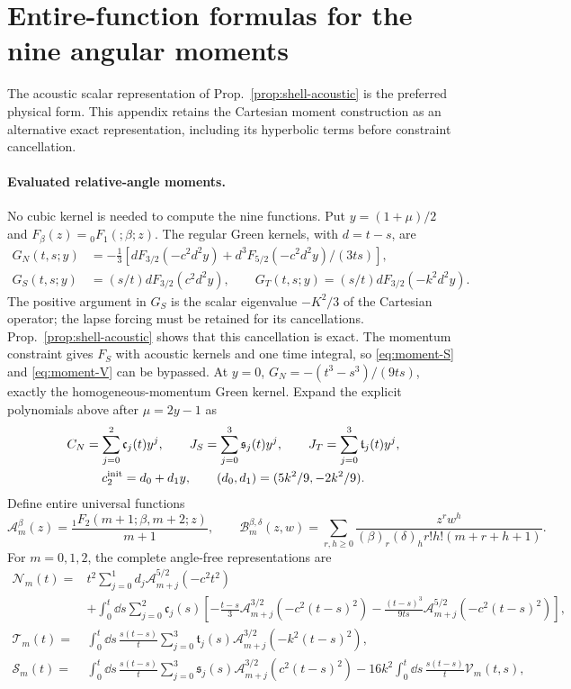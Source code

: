 \section{Entire-function formulas for the nine angular moments}\label{app:scalar-moments}
The acoustic scalar representation of Prop.~\ref{prop:shell-acoustic} is the preferred
physical form. This appendix retains the Cartesian moment construction as an alternative
exact representation, including its hyperbolic terms before constraint cancellation.

\paragraph{Evaluated relative-angle moments.}
No cubic kernel is needed to compute the nine functions. Put $y=(1+\mu)/2$ and
$F_\beta(z)={}_0F_1(;\beta;z)$. The regular Green kernels, with $d=t-s$, are
\begin{align}
 G_N(t,s;y)&=-\tfrac13[dF_{3/2}(-c^2d^2y)+d^3F_{5/2}(-c^2d^2y)/(3ts)],\label{eq:moment-GN}\\
 G_S(t,s;y)&=(s/t)dF_{3/2}(c^2d^2y),\qquad
 G_T(t,s;y)=(s/t)dF_{3/2}(-k^2d^2y).\label{eq:moment-GST}
\end{align}
The positive argument in $G_S$ is the scalar eigenvalue $-K^2/3$ of the Cartesian operator;
the lapse forcing must be retained for its cancellations. Prop.~\ref{prop:shell-acoustic} shows
that this cancellation is exact. The momentum constraint gives $F_S$ with acoustic kernels and one
time integral, so \eqref{eq:moment-S} and \eqref{eq:moment-V} can be bypassed. At $y=0$,
$G_N=-(t^3-s^3)/(9ts)$, exactly the homogeneous-momentum Green kernel.
Expand the explicit polynomials above after $\mu=2y-1$ as
\begin{gather*}
 C_N=\sum_{j=0}^2\mathfrak c_j(t)y^j,\qquad
 J_S=\sum_{j=0}^3\mathfrak s_j(t)y^j,\qquad
 J_T=\sum_{j=0}^3\mathfrak t_j(t)y^j,\\
 c_2^{\rm init}=d_0+d_1y,\qquad(d_0,d_1)=(5k^2/9,-2k^2/9).
\end{gather*}
Define entire universal functions
\begin{equation}\label{eq:moment-entire}
 \mathscr A_m^\beta(z)=\frac{{}_1F_2(m+1;\beta,m+2;z)}{m+1},\qquad
 \mathscr B_m^{\beta,\delta}(z,w)=\sum_{r,h\ge0}
 \frac{z^rw^h}{(\beta)_r(\delta)_h r!h!(m+r+h+1)}.
\end{equation}
For $m=0,1,2$, the complete angle-free representations are
\begin{align}
 \mathcal N_m(t)={}&t^2\sum_{j=0}^1d_j\mathscr A_{m+j}^{5/2}(-c^2t^2)\nonumber\\
 &+\int_0^t\dd s\sum_{j=0}^2\mathfrak c_j(s)
 \left[-\frac{t-s}{3}\mathscr A_{m+j}^{3/2}(-c^2(t-s)^2)
 -\frac{(t-s)^3}{9ts}\mathscr A_{m+j}^{5/2}(-c^2(t-s)^2)\right],\label{eq:moment-N}\\
 \mathcal T_m(t)={}&\int_0^t\dd s\,\frac{s(t-s)}t
 \sum_{j=0}^3\mathfrak t_j(s)\mathscr A_{m+j}^{3/2}(-k^2(t-s)^2),\label{eq:moment-T}\\
 \mathcal S_m(t)={}&\int_0^t\dd s\,\frac{s(t-s)}t
 \sum_{j=0}^3\mathfrak s_j(s)\mathscr A_{m+j}^{3/2}(c^2(t-s)^2)
 -16k^2\int_0^t\dd s\,\frac{s(t-s)}t\mathcal V_m(t,s),\label{eq:moment-S}
\end{align}
